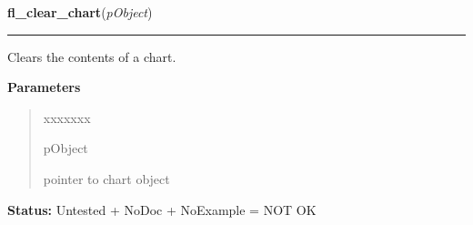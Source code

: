     \label{xformslib:library:fl_clear_chart}

    \vspace{0.5ex}

\hspace{.8\funcindent}\begin{boxedminipage}{\funcwidth}

    \raggedright \textbf{fl\_clear\_chart}(\textit{pObject})

    \vspace{-1.5ex}

    \rule{\textwidth}{0.5\fboxrule}
\setlength{\parskip}{2ex}
    Clears the contents of a chart.

\setlength{\parskip}{1ex}
      \textbf{Parameters}
      \vspace{-1ex}

      \begin{quote}
        \begin{Ventry}{xxxxxxx}

          \item[pObject]

          pointer to chart object

        \end{Ventry}

      \end{quote}

\textbf{Status:} Untested + NoDoc + NoExample = NOT OK



    \end{boxedminipage}

    \label{xformslib:library:fl_add_chart_value}

    \vspace{0.5ex}

